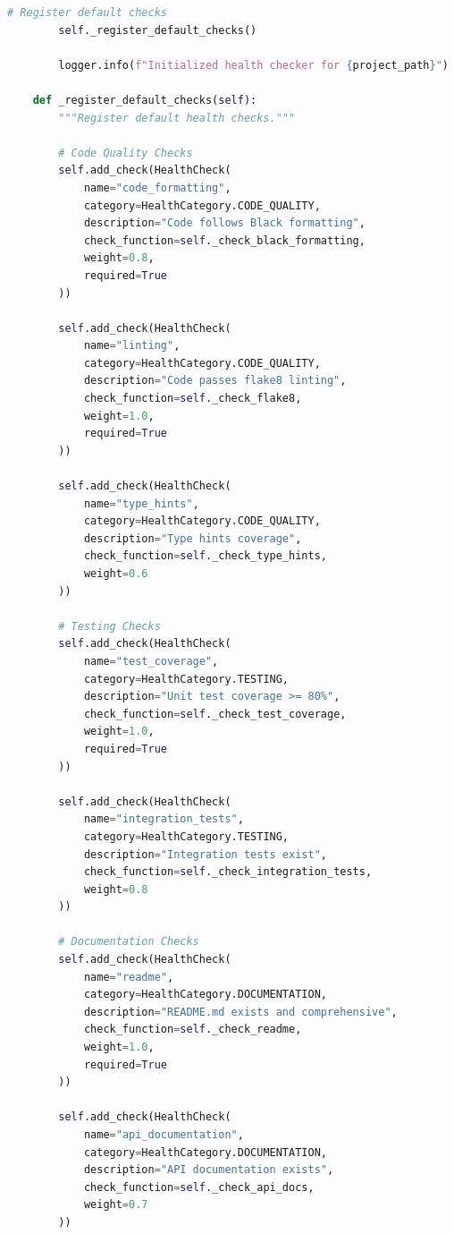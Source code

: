 \begin{lstlisting}[language=Python, caption={ML Project Health Assessment}]
        # Register default checks
        self._register_default_checks()

        logger.info(f"Initialized health checker for {project_path}")

    def _register_default_checks(self):
        """Register default health checks."""

        # Code Quality Checks
        self.add_check(HealthCheck(
            name="code_formatting",
            category=HealthCategory.CODE_QUALITY,
            description="Code follows Black formatting",
            check_function=self._check_black_formatting,
            weight=0.8,
            required=True
        ))

        self.add_check(HealthCheck(
            name="linting",
            category=HealthCategory.CODE_QUALITY,
            description="Code passes flake8 linting",
            check_function=self._check_flake8,
            weight=1.0,
            required=True
        ))

        self.add_check(HealthCheck(
            name="type_hints",
            category=HealthCategory.CODE_QUALITY,
            description="Type hints coverage",
            check_function=self._check_type_hints,
            weight=0.6
        ))

        # Testing Checks
        self.add_check(HealthCheck(
            name="test_coverage",
            category=HealthCategory.TESTING,
            description="Unit test coverage >= 80%",
            check_function=self._check_test_coverage,
            weight=1.0,
            required=True
        ))

        self.add_check(HealthCheck(
            name="integration_tests",
            category=HealthCategory.TESTING,
            description="Integration tests exist",
            check_function=self._check_integration_tests,
            weight=0.8
        ))

        # Documentation Checks
        self.add_check(HealthCheck(
            name="readme",
            category=HealthCategory.DOCUMENTATION,
            description="README.md exists and comprehensive",
            check_function=self._check_readme,
            weight=1.0,
            required=True
        ))

        self.add_check(HealthCheck(
            name="api_documentation",
            category=HealthCategory.DOCUMENTATION,
            description="API documentation exists",
            check_function=self._check_api_docs,
            weight=0.7
        ))


\end{lstlisting}
